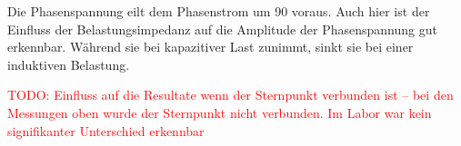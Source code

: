 \begin{flushleft}
Die Phasenspannung eilt dem Phasenstrom um 90 \degree voraus. Auch hier ist der Einfluss der Belastungsimpedanz auf die Amplitude der Phasenspannung gut erkennbar. Während sie bei kapazitiver Last zunimmt, sinkt sie bei einer induktiven Belastung. 


\newpage

\textcolor{red}{TODO: Einfluss auf die Resultate wenn der Sternpunkt verbunden ist -- bei den Messungen oben wurde der Sternpunkt nicht verbunden. Im Labor war kein signifikanter Unterschied erkennbar}
















\end{flushleft}
